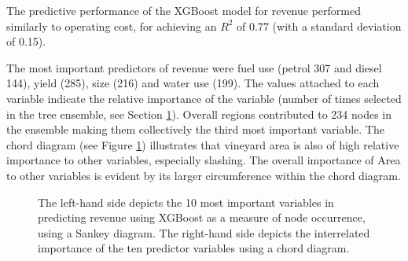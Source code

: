 \documentclass[review,12pt,authoryear]{elsarticle}
\begin{document}
\begin{linenumbers}
 
The predictive performance of the XGBoost model for revenue performed similarly to operating cost, for achieving an $R^2$ of 0.77 (with a standard deviation of 0.15). 
\par
The most important predictors of revenue were fuel use (petrol 307 and diesel 144), yield (285), size (216) and water use (199). The values attached to each variable indicate the relative importance of the variable (number of times selected in the tree ensemble, see Section \ref{fig:revenue_sankey}). Overall regions contributed to 234 nodes in the ensemble making them collectively the third most important variable. The chord diagram (see Figure \ref{fig:revenue_sankey}) illustrates that vineyard area is also of high relative importance to other variables, especially slashing. The overall importance of Area to other variables is evident by its larger circumference within the chord diagram.

\begin{figure}[htb]
  \label{fig:revenue_sankey}
  \caption{The left-hand side depicts the 10 most important variables in predicting revenue using XGBoost as a measure of node occurrence, using a Sankey diagram. The right-hand side depicts the interrelated importance of the ten predictor variables using a chord diagram.}
 \end{figure}


\end{linenumbers}
\end{document}
